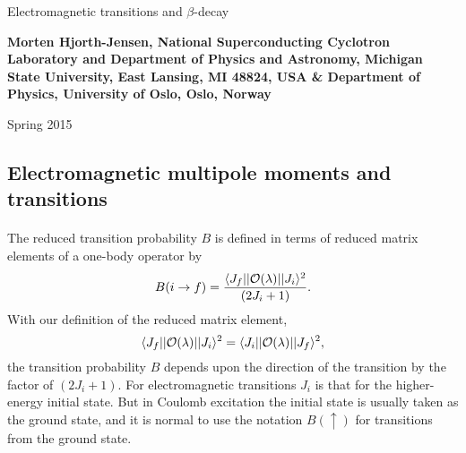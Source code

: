\documentclass[%
twoside,                 %
final,                   %
10pt]{article}
\begin{document}




\thispagestyle{empty}

\begin{center}
{\LARGE\bf
\begin{spacing}{1.25}
Electromagnetic transitions and $\beta$-decay
\end{spacing}
}
\end{center}


\begin{center}
{\bf Morten Hjorth-Jensen, National Superconducting Cyclotron Laboratory and Department of Physics and Astronomy, Michigan State University, East Lansing, MI 48824, USA {\&} Department of Physics, University of Oslo, Oslo, Norway${}^{}$} \\ [0mm]
\end{center}

    \begin{center}
\end{center}
    

\begin{center} %
Spring 2015
\end{center}

\vspace{1cm}


\subsection*{Electromagnetic multipole moments and transitions}

\paragraph{}
The reduced
transition probability $B$ is defined in terms of reduced matrix
elements of a one-body operator by
\[
B(i \rightarrow f)= \frac{\langle J_{f}||{\cal O}(\lambda )||J_{i}\rangle^{2}}{(2J_{i}+1)}. 
\]
With our definition of the reduced matrix element,
\[
\langle J_{f}||{\cal O}(\lambda )||J_{i}\rangle^{2} =\langle J_{i}||{\cal O}(\lambda )||J_{f}\rangle^{2},  
\]
the transition probability $B$ depends upon the direction of the transition by the factor
of $(2J_{i}+1)$. For electromagnetic
transitions $J_{i}$ is that for the higher-energy initial state. But in
Coulomb excitation the initial state is usually
taken as the ground state, and it is normal to use the notation $B(\uparrow)$ for transitions from the ground state.
\end{document}
